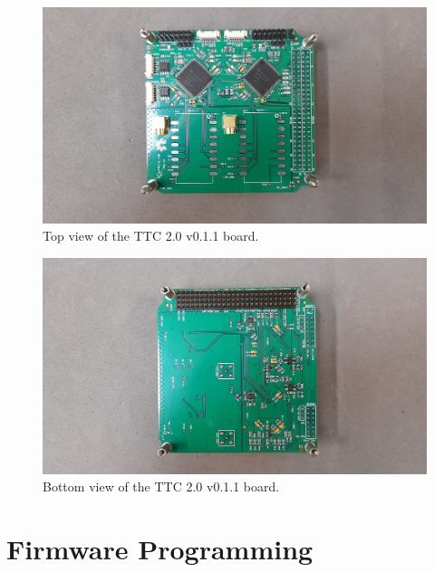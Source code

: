 \begin{figure}[!ht]
    \begin{center}
        \includegraphics[width=\columnwidth]{figures/v011/ttc2-v011-top.jpg}
        \caption{Top view of the TTC 2.0 v0.1.1 board.}
        \label{fig:ttc2-v011-top}
    \end{center}
\end{figure}

\begin{figure}[!ht]
    \begin{center}
        \includegraphics[width=\columnwidth]{figures/v011/ttc2-v011-bottom.jpg}
        \caption{Bottom view of the TTC 2.0 v0.1.1 board.}
        \label{fig:ttc2-v011-bottom}
    \end{center}
\end{figure}

\section{Firmware Programming}

